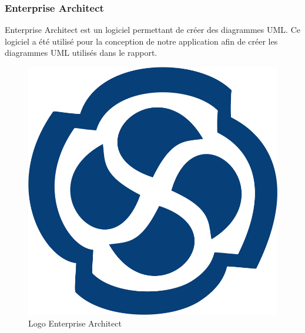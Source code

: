 \subsubsection{Enterprise Architect}
\noindent\begin{minipage}{0.69\textwidth}
Enterprise Architect est un logiciel permettant de créer des diagrammes UML. Ce logiciel a été utilisé pour la conception de notre application afin de créer les diagrammes UML utilisés dans le rapport.
\end{minipage}
\begin{minipage}{0.3\textwidth}
\begin{figure}[H]
  \centering
  \includegraphics[scale=0.3]{figures/logo/enterprisearchitect.png}
  \caption{Logo Enterprise Architect}
  \label{code25}
\end{figure}
\end{minipage}
